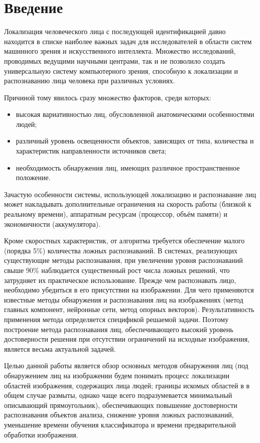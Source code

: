 \newpage
\section*{Введение}

Локализация человеческого лица с последующей идентификацией давно находится в списке наиболее важных задач для исследователей в области систем машинного зрения и искусственного интеллекта. Множество исследований, проводимых ведущими научными центрами, так и не позволило создать универсальную систему компьютерного зрения, способную к локализации и распознаванию лица человека при различных условиях.

Причиной тому явилось сразу множество факторов, среди которых:
\begin{itemize}
\item высокая вариативностью лиц, обусловленной анатомическими особенностями людей;
\item различный уровень освещенности объектов, зависящих от типа, количества и характеристик направленности источников света;
\item необходимость обнаружения лиц, имеющих различное пространственное положение.
\end{itemize}

Зачастую особенности системы, использующей локализацию и распознавание лиц может накладывать дополнительные ограничения на скорость работы (близкой к реальному времени), аппаратным ресурсам (процессор, объём памяти) и экономичности (аккумулятора).

Кроме скоростных характеристик, от алгоритма требуется обеспечение малого (порядка 5\%) количества ложных распознаваний. В системах, реализующих существующие методы распознавания, при увеличении уровня распознаваний свыше 90\% наблюдается существенный рост числа ложных решений, что затрудняет их практическое использование. Прежде чем распознавать лицо, необходимо убедиться в его присутствии на изображении. Для чего применяются известные методы обнаружения и распознавания лиц на изображениях (метод главных компонент, нейронные сети, метод опорных векторов). Результативность применения метода определяется спецификой решаемой задачи. Поэтому построение метода распознавания лиц, обеспечивающего высокий уровень достоверности решения при отсутствии ограничений на исходные изображения, является весьма актуальной задачей.

Целью данной работы является обзор основных методов обнаружения лиц (под обнаружением лиц на изображении будем понимать процесс локализации областей изображения, содержащих лица людей; границы искомых областей в в общем случае размыты, однако чаще всего подразумевается минимальный описывающий прямоугольник), обеспечивающих повышение достоверности распознавания объектов анализа, снижение уровня ложных распознаваний, уменьшение времени обучения классификатора и времени предварительной обработки изображения.